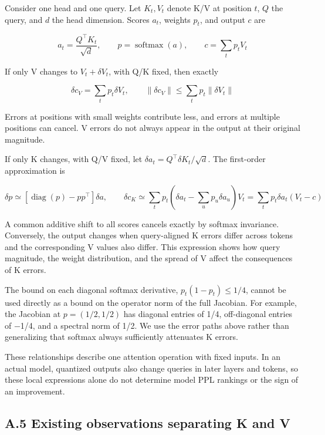 \documentclass[10pt,a4paper]{article}
\begin{document}
Consider one head and one query. Let \(K_t,V_t\) denote K/V at position \(t\), \(Q\) the query, and \(d\) the head dimension. Scores \(a_t\), weights \(p_t\), and output \(c\) are

\[
a_t=\frac{Q^\top K_t}{\sqrt d},\qquad
p=\operatorname{softmax}(a),\qquad
c=\sum_t p_tV_t
\]

If only V changes to \(V_t+\delta V_t\), with Q/K fixed, then exactly

\[
\delta c_V=\sum_t p_t\delta V_t,\qquad
\|\delta c_V\|\le\sum_t p_t\|\delta V_t\|
\]

Errors at positions with small weights contribute less, and errors at multiple positions can cancel. V errors do not always appear in the output at their original magnitude.

If only K changes, with Q/V fixed, let \(\delta a_t=Q^\top\delta K_t/\sqrt d\). The first-order approximation is

\[
\delta p\simeq[\operatorname{diag}(p)-pp^\top]\delta a,\qquad
\delta c_K\simeq\sum_t p_t\left(\delta a_t-\sum_u p_u\delta a_u\right)V_t
=\sum_t p_t\delta a_t(V_t-c)
\]

A common additive shift to all scores cancels exactly by softmax invariance. Conversely, the output changes when query-aligned K errors differ across tokens and the corresponding V values also differ. This expression shows how query magnitude, the weight distribution, and the spread of V affect the consequences of K errors.

The bound on each diagonal softmax derivative, \(p_t(1-p_t)\le1/4\), cannot be used directly as a bound on the operator norm of the full Jacobian. For example, the Jacobian at \(p=(1/2,1/2)\) has diagonal entries of 1/4, off-diagonal entries of −1/4, and a spectral norm of 1/2. We use the error paths above rather than generalizing that softmax always sufficiently attenuates K errors.

These relationships describe one attention operation with fixed inputs. In an actual model, quantized outputs also change queries in later layers and tokens, so these local expressions alone do not determine model PPL rankings or the sign of an improvement.

\subsection{A.5 Existing observations separating K and V}\label{a.5-existing-observations-separating-k-and-v}
\end{document}

